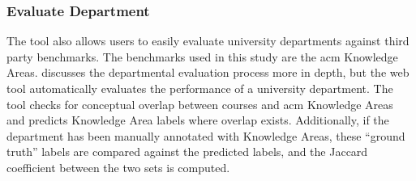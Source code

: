 
\subsubsection{Evaluate Department}
\label{sec:vis-evaluate}


The tool also allows users to easily evaluate university departments against third party benchmarks.
The benchmarks used in this study are the \ac{acm} Knowledge Areas.
 discusses the departmental evaluation process more in depth, but the web tool automatically evaluates the performance of a university department.
The tool checks for conceptual overlap between courses and \ac{acm} Knowledge Areas and predicts Knowledge Area labels where overlap exists.
Additionally, if the department has been manually annotated with Knowledge Areas, these ``ground truth'' labels are compared against the predicted labels, and the Jaccard coefficient between the two sets is computed.

